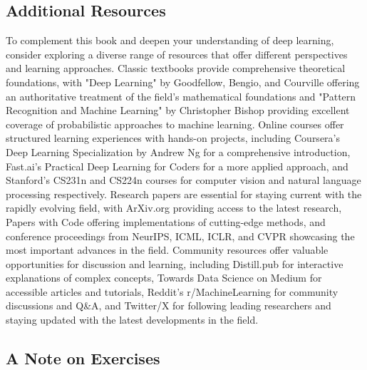 \subsection{Additional Resources}

To complement this book and deepen your understanding of deep learning, consider exploring a diverse range of resources that offer different perspectives and learning approaches. Classic textbooks provide comprehensive theoretical foundations, with "Deep Learning" by Goodfellow, Bengio, and Courville offering an authoritative treatment of the field's mathematical foundations and "Pattern Recognition and Machine Learning" by Christopher Bishop providing excellent coverage of probabilistic approaches to machine learning. Online courses offer structured learning experiences with hands-on projects, including Coursera's Deep Learning Specialization by Andrew Ng for a comprehensive introduction, Fast.ai's Practical Deep Learning for Coders for a more applied approach, and Stanford's CS231n and CS224n courses for computer vision and natural language processing respectively. Research papers are essential for staying current with the rapidly evolving field, with ArXiv.org providing access to the latest research, Papers with Code offering implementations of cutting-edge methods, and conference proceedings from NeurIPS, ICML, ICLR, and CVPR showcasing the most important advances in the field. Community resources offer valuable opportunities for discussion and learning, including Distill.pub for interactive explanations of complex concepts, Towards Data Science on Medium for accessible articles and tutorials, Reddit's r/MachineLearning for community discussions and Q\&A, and Twitter/X for following leading researchers and staying updated with the latest developments in the field.

\subsection{A Note on Exercises}

